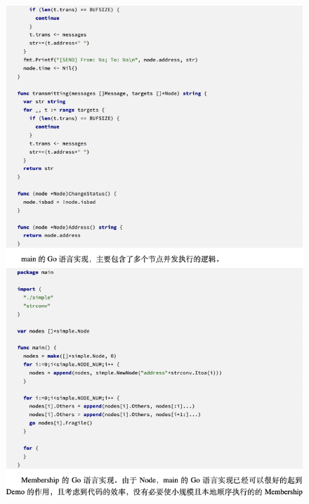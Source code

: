  \begin{figure}[!htbp]
    \small
    \centering
    \includegraphics[width=14cm]{../figures/code/3.png}
 \end{figure}
